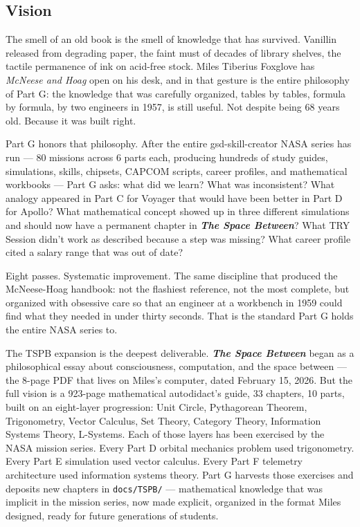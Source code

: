 \documentclass[11pt,letterpaper]{article}
\newcommand{\tspb}{\textbf{\textit{The Space Between}}}
\begin{document}
\subsection{Vision}

The smell of an old book is the smell of knowledge that has survived. Vanillin released from degrading paper, the faint must of decades of library shelves, the tactile permanence of ink on acid-free stock. Miles Tiberius Foxglove has \textit{McNeese and Hoag} open on his desk, and in that gesture is the entire philosophy of Part G: the knowledge that was carefully organized, tables by tables, formula by formula, by two engineers in 1957, is still useful. Not despite being 68 years old. Because it was built right.

Part G honors that philosophy. After the entire gsd-skill-creator NASA series has run --- 80 missions across 6 parts each, producing hundreds of study guides, simulations, skills, chipsets, CAPCOM scripts, career profiles, and mathematical workbooks --- Part G asks: what did we learn? What was inconsistent? What analogy appeared in Part C for Voyager that would have been better in Part D for Apollo? What mathematical concept showed up in three different simulations and should now have a permanent chapter in \tspb? What TRY Session didn't work as described because a step was missing? What career profile cited a salary range that was out of date?

Eight passes. Systematic improvement. The same discipline that produced the McNeese-Hoag handbook: not the flashiest reference, not the most complete, but organized with obsessive care so that an engineer at a workbench in 1959 could find what they needed in under thirty seconds. That is the standard Part G holds the entire NASA series to.

The TSPB expansion is the deepest deliverable. \tspb{} began as a philosophical essay about consciousness, computation, and the space between --- the 8-page PDF that lives on Miles's computer, dated February 15, 2026. But the full vision is a 923-page mathematical autodidact's guide, 33 chapters, 10 parts, built on an eight-layer progression: Unit Circle, Pythagorean Theorem, Trigonometry, Vector Calculus, Set Theory, Category Theory, Information Systems Theory, L-Systems. Each of those layers has been exercised by the NASA mission series. Every Part D orbital mechanics problem used trigonometry. Every Part E simulation used vector calculus. Every Part F telemetry architecture used information systems theory. Part G harvests those exercises and deposits new chapters in \texttt{docs/TSPB/} --- mathematical knowledge that was implicit in the mission series, now made explicit, organized in the format Miles designed, ready for future generations of students.
\end{document}
